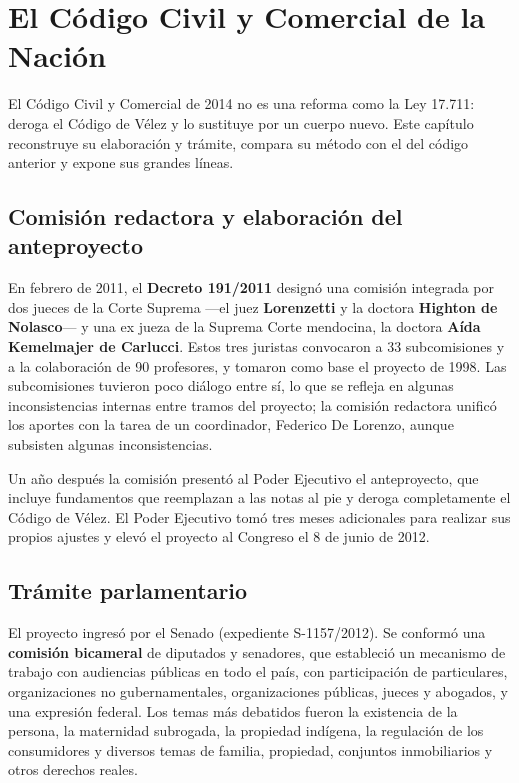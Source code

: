 \documentclass[12pt,oneside]{book}
\begin{document}
\chapter{El Código Civil y Comercial de la Nación}
\label{cap:ccyc}

El Código Civil y Comercial de 2014 no es una reforma como la Ley 17.711: deroga el Código de Vélez y lo sustituye por un cuerpo nuevo. Este capítulo reconstruye su elaboración y trámite, compara su método con el del código anterior y expone sus grandes líneas.

\section{Comisión redactora y elaboración del anteproyecto}

En febrero de 2011, el \textbf{Decreto 191/2011} designó una comisión integrada por dos jueces de la Corte Suprema ---el juez \textbf{Lorenzetti} y la doctora \textbf{Highton de Nolasco}--- y una ex jueza de la Suprema Corte mendocina, la doctora \textbf{Aída Kemelmajer de Carlucci}. Estos tres juristas convocaron a 33 subcomisiones y a la colaboración de 90 profesores, y tomaron como base el proyecto de 1998. Las subcomisiones tuvieron poco diálogo entre sí, lo que se refleja en algunas inconsistencias internas entre tramos del proyecto; la comisión redactora unificó los aportes con la tarea de un coordinador, Federico De Lorenzo, aunque subsisten algunas inconsistencias.

Un año después la comisión presentó al Poder Ejecutivo el anteproyecto, que incluye fundamentos que reemplazan a las notas al pie y deroga completamente el Código de Vélez. El Poder Ejecutivo tomó tres meses adicionales para realizar sus propios ajustes y elevó el proyecto al Congreso el 8 de junio de 2012.

\section{Trámite parlamentario}

El proyecto ingresó por el Senado (expediente S-1157/2012). Se conformó una \textbf{comisión bicameral} de diputados y senadores, que estableció un mecanismo de trabajo con audiencias públicas en todo el país, con participación de particulares, organizaciones no gubernamentales, organizaciones públicas, jueces y abogados, y una expresión federal. Los temas más debatidos fueron la existencia de la persona, la maternidad subrogada, la propiedad indígena, la regulación de los consumidores y diversos temas de familia, propiedad, conjuntos inmobiliarios y otros derechos reales.
\end{document}
